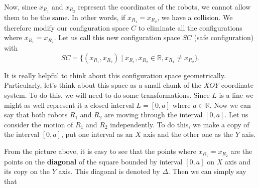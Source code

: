 \documentclass[a4paper, twocolumn]{article}
\newcommand{\reals}{\mathbb{R}}                  %
\theoremstyle{definition}
\begin{document}
\medskip

Now, since $x_{R_1}$ and $x_{R_2}$ represent the coordinates of the robots, we cannot allow them to be the same.
In other words, if $x_{R_1} = x_{R_2}$, we have a collision. We therefore modify our configuration space $C$
to eliminate all the configurations where $x_{R_1} = x_{R_2}$. Let us call this new configuration space $SC$
(safe configuration) with
$$SC = \{(x_{R_1}, x_{R_2}) \mid x_{R_1}, x_{R_2} \in \reals, x_{R_1} \neq x_{R_2}\}.$$

\medskip

It is really helpful to think about this configuration space geometrically.
Particularly, let's think about this space as a small chunk of the $XOY$ coordinate system.
To do this, we will need to do some transformations. Since $L$ is a line we might as well
represent it a closed interval $L = [0, a]$ where $a \in \reals$. Now we can say that both
robots $R_1$ and $R_2$ are moving through the interval $[0, a]$.
Let us consider the motion of $R_1$ and $R_2$ independently. To do this, we make a copy
of the interval $[0, a]$, put one interval as an $X$ axis and the other one as the $Y$ axis.

\begin{figure}[H]
\centering
{}
\end{figure}

From the picture above, it is easy to see that the points where $x_{R_1} = x_{R_2}$
are the points on the \textbf{diagonal} of the square bounded by interval $[0, a]$ on $X$ axis
and its copy on the $Y$ axis. This diagonal is denoted by $\Delta$. Then we can simply
say that
\end{document}
